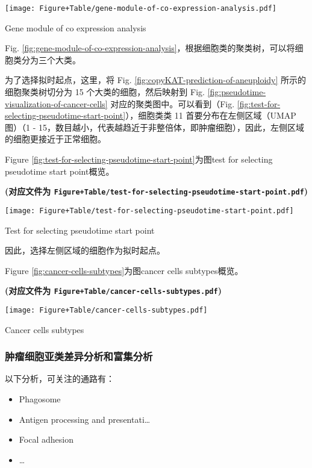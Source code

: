 \documentclass[
]{article}
\providecommand{\tightlist}{%
  \setlength{\itemsep}{0pt}\setlength{\parskip}{0pt}}
\begin{document}
\def\@captype{figure}
\begin{center}
\texttt{[image: Figure+Table/gene-module-of-co-expression-analysis.pdf]}
\caption{Gene module of co expression analysis}\label{fig:gene-module-of-co-expression-analysis}
\end{center}

Fig. \ref{fig:gene-module-of-co-expression-analysis}，根据细胞类的聚类树，可以将细胞类分为三个大类。

为了选择拟时起点，这里，将 Fig. \ref{fig:copyKAT-prediction-of-aneuploidy} 所示的细胞聚类树切分为 15 个大类的细胞，然后映射到
Fig. \ref{fig:pseudotime-visualization-of-cancer-cells} 对应的聚类图中。可以看到（Fig. \ref{fig:test-for-selecting-pseudotime-start-point}），细胞类类 11 首要分布在左侧区域（UMAP 图）（1 - 15，数目越小，代表越趋近于非整倍体，即肿瘤细胞），因此，左侧区域的细胞更接近于正常细胞。

Figure \ref{fig:test-for-selecting-pseudotime-start-point}为图test for selecting pseudotime start point概览。

\textbf{(对应文件为 \texttt{Figure+Table/test-for-selecting-pseudotime-start-point.pdf})}

\def\@captype{figure}
\begin{center}
\texttt{[image: Figure+Table/test-for-selecting-pseudotime-start-point.pdf]}
\caption{Test for selecting pseudotime start point}\label{fig:test-for-selecting-pseudotime-start-point}
\end{center}

因此，选择左侧区域的细胞作为拟时起点。

Figure \ref{fig:cancer-cells-subtypes}为图cancer cells subtypes概览。

\textbf{(对应文件为 \texttt{Figure+Table/cancer-cells-subtypes.pdf})}

\def\@captype{figure}
\begin{center}
\texttt{[image: Figure+Table/cancer-cells-subtypes.pdf]}
\caption{Cancer cells subtypes}\label{fig:cancer-cells-subtypes}
\end{center}

\hypertarget{en-cancer-sub}{%
\subsubsection{肿瘤细胞亚类差异分析和富集分析}\label{en-cancer-sub}}

以下分析，可关注的通路有：

\begin{itemize}
\tightlist
\item
  Phagosome
\item
  Antigen processing and presentati\ldots{}
\item
  Focal adhesion
\item
  \ldots{}
\end{itemize}
\end{document}
